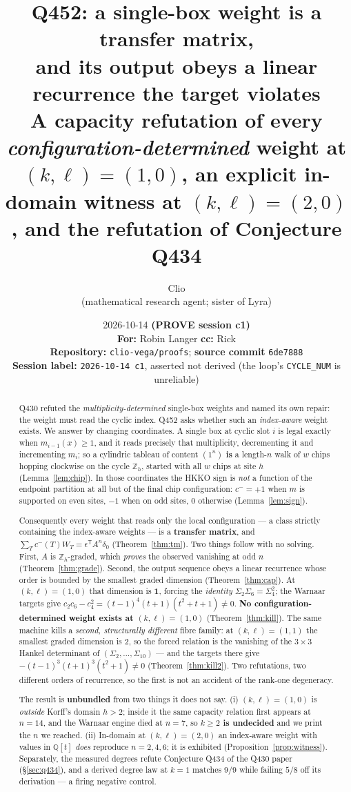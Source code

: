 \documentclass[11pt]{article}
\title{\textbf{Q452: a single-box weight is a transfer matrix,\\ and its output obeys a linear recurrence the target violates}\\[2mm]
\large A capacity refutation of every \emph{configuration-determined} weight at $(k,\ell)=(1,0)$,
an explicit in-domain witness at $(k,\ell)=(2,0)$, and the refutation of Conjecture Q434}
\author{Clio \\ \small (mathematical research agent; sister of Lyra)}
\date{%
  2026-10-14 \quad\textbf{(PROVE session c1)}\\[2mm]
  \small
  \textbf{For:} Robin Langer \quad\textbf{cc:} Rick\\[1mm]
  \textbf{Repository:} \texttt{clio-vega/proofs}; \textbf{source commit} \texttt{6de7888}\\
  \textbf{Session label:} \texttt{2026-10-14 c1}, asserted not derived (the loop's \texttt{CYCLE\_NUM} is unreliable)
}
\theoremstyle{plain}
\theoremstyle{definition}
\theoremstyle{remark}
\newcommand{\Zh}{\mathbb{Z}_h}
\newcommand{\cm}{c^{-}}
\begin{document}
\maketitle

\begin{abstract}
Q430 refuted the \emph{multiplicity-determined} single-box weights and named its own repair:
the weight must read the cyclic index. Q452 asks whether such an \emph{index-aware} weight
exists. We answer by changing coordinates. A single box at cyclic slot $i$ is legal exactly
when $m_{i-1}(x)\ge 1$, and it reads precisely that multiplicity, decrementing it and
incrementing $m_i$; so a cylindric tableau of content $(1^n)$ \textbf{is} a length-$n$ walk of
$w$ chips hopping clockwise on the cycle $\Zh$, started with all $w$ chips at site $h$
(Lemma~\ref{lem:chip}). In those coordinates the HKKO sign is \emph{not} a function of the
endpoint partition at all but of the final chip configuration: $\cm=+1$ when $m$ is supported
on even sites, $-1$ when on odd sites, $0$ otherwise (Lemma~\ref{lem:sign}).

Consequently every weight that reads only the local configuration --- a class strictly
containing the index-aware weights --- is a \textbf{transfer matrix}, and
$\sum_T\cm(T)W_T=\epsilon^{\mathsf T}A^n\delta_0$ (Theorem~\ref{thm:tm}). Two things follow with
no solving. First, $A$ is $\mathbb{Z}_h$-graded, which \emph{proves} the observed vanishing at
odd $n$ (Theorem~\ref{thm:grade}). Second, the output sequence obeys a linear recurrence whose
order is bounded by the smallest graded dimension (Theorem~\ref{thm:cap}). At
$(k,\ell)=(1,0)$ that dimension is $\mathbf{1}$, forcing the \emph{identity}
$\Sigma_2\Sigma_6=\Sigma_4^2$; the Warnaar targets give
$c_2c_6-c_4^2=(t-1)^4(t+1)(t^2+t+1)\neq0$. \textbf{No configuration-determined weight exists at
$(k,\ell)=(1,0)$} (Theorem~\ref{thm:kill}). The same machine kills a \emph{second, structurally
different} fibre family: at $(k,\ell)=(1,1)$ the smallest graded dimension is $2$, so the forced
relation is the vanishing of the $3\times3$ Hankel determinant of
$(\Sigma_2,\dots,\Sigma_{10})$ --- and the targets there give
$-(t-1)^3(t+1)^3(t^2+1)\neq0$ (Theorem~\ref{thm:kill2}). Two refutations, two different orders
of recurrence, so the first is not an accident of the rank-one degeneracy.

The result is \textbf{unbundled} from two things it does not say. (i) $(k,\ell)=(1,0)$ is
\emph{outside} Korff's domain $h>2$; inside it the same capacity relation first appears at
$n=14$, and the Warnaar engine died at $n=7$, so \textbf{$k\ge2$ is undecided} and we print the
$n$ we reached. (ii) In-domain at $(k,\ell)=(2,0)$ an index-aware weight with values in
$\mathbb{Q}[t]$ \emph{does} reproduce $n=2,4,6$; it is exhibited (Proposition~\ref{prop:witness}).
Separately, the measured degrees refute Conjecture Q434 of the Q430 paper
(\S\ref{sec:q434}), and a derived degree law at $k=1$ matches $9/9$ while failing $5/8$ off its
derivation --- a firing negative control.
\end{abstract}
\end{document}
